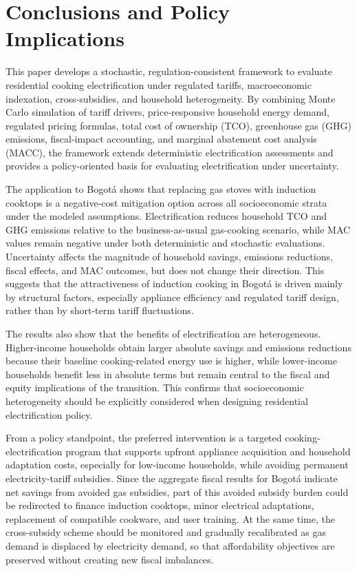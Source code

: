 \documentclass[authoryear,preprint,review,10pt]{elsarticle}
\begin{document}
\section{Conclusions and Policy Implications}
\label{conclusions}

This paper develops a stochastic, regulation-consistent framework to evaluate residential cooking electrification under regulated tariffs, macroeconomic indexation, cross-subsidies, and household heterogeneity. By combining Monte Carlo simulation of tariff drivers, price-responsive household energy demand, regulated pricing formulas, total cost of ownership (TCO), greenhouse gas (GHG) emissions, fiscal-impact accounting, and marginal abatement cost analysis (MACC), the framework extends deterministic electrification assessments and provides a policy-oriented basis for evaluating electrification under uncertainty.

The application to Bogotá shows that replacing gas stoves with induction cooktops is a negative-cost mitigation option across all socioeconomic strata under the modeled assumptions. Electrification reduces household TCO and GHG emissions relative to the business-as-usual gas-cooking scenario, while MAC values remain negative under both deterministic and stochastic evaluations. Uncertainty affects the magnitude of household savings, emissions reductions, fiscal effects, and MAC outcomes, but does not change their direction. This suggests that the attractiveness of induction cooking in Bogotá is driven mainly by structural factors, especially appliance efficiency and regulated tariff design, rather than by short-term tariff fluctuations.

The results also show that the benefits of electrification are heterogeneous. Higher-income households obtain larger absolute savings and emissions reductions because their baseline cooking-related energy use is higher, while lower-income households benefit less in absolute terms but remain central to the fiscal and equity implications of the transition. This confirms that socioeconomic heterogeneity should be explicitly considered when designing residential electrification policy.

From a policy standpoint, the preferred intervention is a targeted cooking-electrification program that supports upfront appliance acquisition and household adaptation costs, especially for low-income households, while avoiding permanent electricity-tariff subsidies. Since the aggregate fiscal results for Bogotá indicate net savings from avoided gas subsidies, part of this avoided subsidy burden could be redirected to finance induction cooktops, minor electrical adaptations, replacement of compatible cookware, and user training. At the same time, the cross-subsidy scheme should be monitored and gradually recalibrated as gas demand is displaced by electricity demand, so that affordability objectives are preserved without creating new fiscal imbalances.
\end{document}

